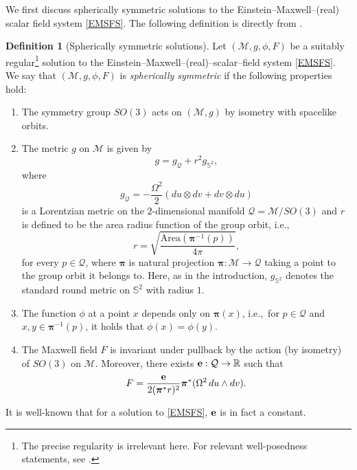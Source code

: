 \documentclass[10pt, reqno]{amsart}
\theoremstyle{definition}
\newtheorem{definition}[theorem]{Definition}
\theoremstyle{remark}
\numberwithin{equation}{section}
\newcommand{\0}{\emptyset}
\newcommand{\Omg}{\Omega}
\newcommand{\bfe}{{\bf e}}
\newcommand{\calM}{\mathcal M}
\newcommand{\f}{\frac}
\begin{document}
We first discuss spherically symmetric solutions to the Einstein--Maxwell--(real) scalar field system \eqref{EMSFS}. The following definition is directly from \cite{LO.interior}.
\begin{definition}[Spherically symmetric solutions]\label{def.SS}
Let $(\mathcal M,g,\phi,F)$ be a suitably regular\footnote{The precise regularity is irrelevant here. For relevant well-posedness statements, see \cite[Propositionss~2.4, 2.5]{LO.interior}.} solution to the Einstein--Maxwell--(real)--scalar--field system \eqref{EMSFS}. We say that $(\mathcal M,g,\phi,F)$ is \emph{spherically symmetric} if the following properties hold:
\begin{enumerate}
\item The symmetry group $SO(3)$ acts on $(\mathcal M,g)$ by isometry with spacelike orbits.
\item The metric $g$ on $\mathcal M$ is given by
\begin{equation}\label{SS.metric.1}
g=g_{\mathcal Q}+r^2 g_{\mathbb S^2},
\end{equation}
where
\begin{equation}\label{SS.metric.2}
g_{\mathcal Q}=-\f{\Omg^2 }{2}(du\otimes dv+dv\otimes du)
\end{equation}
is a Lorentzian metric on the $2$-dimensional manifold $\mathcal Q=\mathcal M/SO(3)$ and $r$ is defined to be the area radius function of the group orbit, i.e.,
$$r=\sqrt{\f{\mbox{Area}({\boldsymbol \pi}^{-1}(p))}{4\pi}},$$
for every $p\in \mathcal Q$, where ${\boldsymbol \pi}$ is natural projection ${\boldsymbol \pi}:\mathcal M\to \mathcal Q$ taking a point to the group orbit it belongs to. Here, as in the introduction, $g_{\mathbb S^2}$ denotes the standard round metric on $\mathbb S^2$ with radius $1$.
\item The function $\phi$ at a point $x$ depends only on ${\boldsymbol \pi}(x)$, i.e.,~for $p\in \mathcal Q$ and $x,y\in {\boldsymbol \pi}^{-1}(p)$, it holds that $\phi(x)=\phi(y)$.
\item The Maxwell field $F$ is invariant under pullback by the action (by isometry) of $SO(3)$ on $\calM$.
Moreover, there exists ${\bf e}:\mathcal Q\to \mathbb R$ such that
$$F=\f{\bfe}{2({\boldsymbol \pi}^* r)^2}{\boldsymbol \pi}^*(\Omg^2\,du\wedge dv).$$
\end{enumerate}
\end{definition}

It is well-known that for a solution to \eqref{EMSFS}, ${\bf e}$ is in fact a constant.
\end{document}

